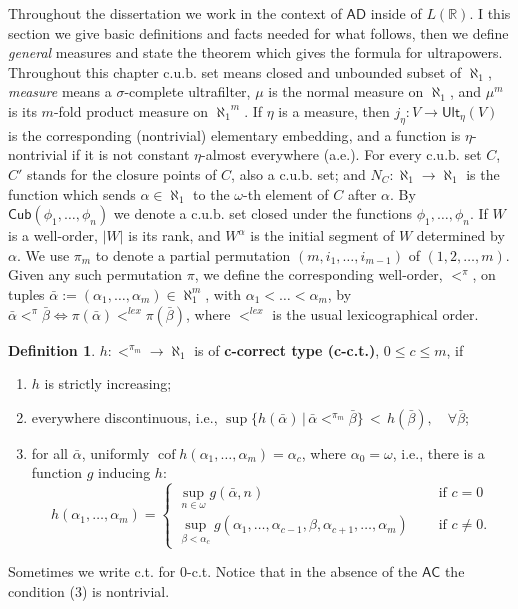 \documentclass[bibother]{asl}
\theoremstyle{definition}
\newtheorem{defn}[thm]{Definition}
\theoremstyle{remark}
\newcommand{\ad}{\textsf{AD}}
\newcommand{\ac}{\textsf{AC}}
\newcommand{\ult}{\textsf{Ult}}
\newcommand{\Cub}{\textsf{Cub}}
\newcommand{\cub}{\textrm{c.u.b.}}
\newcommand{\om}{\omega}
\newcommand{\LR}{{L(\mathbb{R})}}
\newcommand{\al}[1]{{\aleph_{#1}}}
\newcommand{\cof}{\operatorname{cof}}
\newcommand{\rc}[2]{{\color{red}#2}\marginnote{{\color{red}#1}}}
\begin{document}
Throughout the dissertation we work in the context of $\ad$ inside of $\LR$. I this section we give basic definitions and facts needed for what follows, then
we define {\em general} measures and state the theorem which gives the formula for ultrapowers.
Throughout this chapter $\cub$ set means closed and unbounded subset of $\al{1}$, {\em measure} means a $\sigma$-complete ultrafilter, 
$\mu$ is the normal measure on $\al{1}$, and $\mu^m$ is its $m$-fold product measure on $\al{1}^m$.
If $\eta$ is a measure, then $j_\eta:V\to\ult_\eta(V)$ is the corresponding 
\rc{!}{(nontrivial) elementary embedding}, and 
a function is $\eta$-nontrivial if it is not constant $\eta$-almost everywhere (a.e.).
For every $\cub$ set $C$, $C'$ stands for the closure points of $C$, also a $\cub$ set;
and $N_C:\al{1}\to\al{1}$ is the function which sends $\alpha\in\al{1}$ to the $\om$-th element of $C$ after $\alpha$.
By $\Cub(\phi_1,\dots,\phi_n)$ we denote a $\cub$ set closed under the functions
$\phi_1,\dots,\phi_n$.
If $W$ is a well-order, $|W|$ is its rank, and $W^\alpha$ is the initial segment of 
$W$ determined by $\alpha$.
We use $\pi_m$ to denote a partial permutation $(m,i_1,\dots,i_{m-1})$ of $(1,2,\dots,m)$. Given any such permutation $\pi$, we define the corresponding well-order, $<^\pi$, on tuples $\bar{\alpha}:=(\alpha_1,\dots,\alpha_m)\in \aleph_1^m$, with $\alpha_1<\dots<\alpha_m$, by
$\bar{\alpha}<^\pi \bar{\beta} \iff \pi(\bar{\alpha}) <^{lex} \pi(\bar{\beta})
$,
where $<^{lex}$ is the usual lexicographical order.
\begin{defn}
$h:<^{\pi_m}\to\aleph_1$ is of \textbf{c-correct type (c-c.t.)}, $0\le c\le m$, if 
\begin{enumerate}
\item $h$ is strictly increasing;
\item  everywhere discontinuous, i.e., 
$\sup\{h(\bar{\alpha})  \,  | \, \bar{\alpha} <^{\pi_m} \bar{\beta}\} \, <\, h(\bar{\beta}), \quad \forall\bar{\beta}$;
\item for all $\bar{\alpha}$, uniformly $\cof h(\alpha_1,\dots,\alpha_m)=\alpha_c$, where $\alpha_0=\om$, i.e., there is a function $g$ inducing $h$:
\begin{equation*}
   h(\alpha_1,\dots,\alpha_m) = \begin{cases}
      \sup_{n\in \om} g(\bar\alpha,n)  & \text{ if } c=0\\
      \sup_{\beta<\alpha_c} g(\alpha_1,\dots,\alpha_{c-1},\beta,\alpha_{c+1},\dots,\alpha_m)
      \quad &\text{ if } c\ne 0.
\end{cases}
\end{equation*}
\end{enumerate}
\end{defn}
Sometimes we write c.t. for 0-c.t. Notice that in the absence of the $\ac$ the condition (3) is nontrivial.
\end{document}
